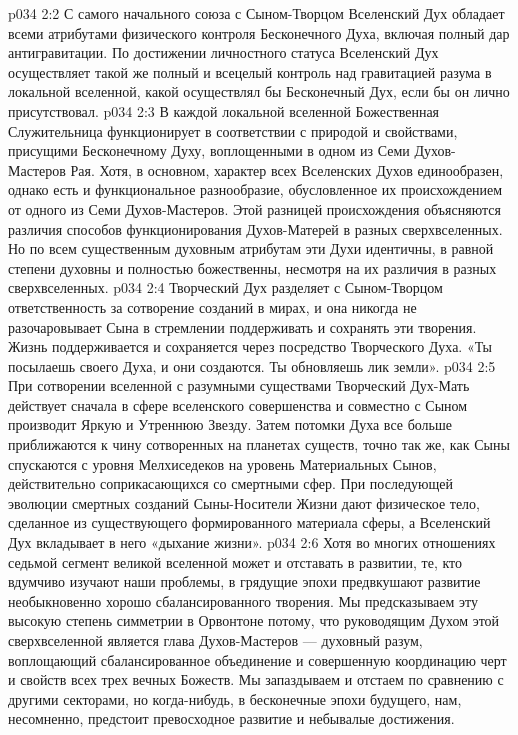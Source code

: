 \vs p034 2:2 С самого начального союза с Сыном\hyp{}Творцом Вселенский Дух обладает всеми атрибутами физического контроля Бесконечного Духа, включая полный дар антигравитации. По достижении личностного статуса Вселенский Дух осуществляет такой же полный и всецелый контроль над гравитацией разума в локальной вселенной, какой осуществлял бы Бесконечный Дух, если бы он лично присутствовал.
\vs p034 2:3 \pc В каждой локальной вселенной Божественная Служительница функционирует в соответствии с природой и свойствами, присущими Бесконечному Духу, воплощенными в одном из Семи Духов\hyp{}Мастеров Рая. Хотя, в основном, характер всех Вселенских Духов единообразен, однако есть и функциональное разнообразие, обусловленное их происхождением от одного из Семи Духов\hyp{}Мастеров. Этой разницей происхождения объясняются различия способов функционирования Духов\hyp{}Матерей в разных сверхвселенных. Но по всем существенным духовным атрибутам эти Духи идентичны, в равной степени духовны и полностью божественны, несмотря на их различия в разных сверхвселенных.
\vs p034 2:4 \pc Творческий Дух разделяет с Сыном\hyp{}Творцом ответственность за сотворение созданий в мирах, и она никогда не разочаровывает Сына в стремлении поддерживать и сохранять эти творения. Жизнь поддерживается и сохраняется через посредство Творческого Духа. «Ты посылаешь своего Духа, и они создаются. Ты обновляешь лик земли».
\vs p034 2:5 При сотворении вселенной с разумными существами Творческий Дух\hyp{}Мать действует сначала в сфере вселенского совершенства и совместно с Сыном производит Яркую и Утреннюю Звезду. Затем потомки Духа все больше приближаются к чину сотворенных на планетах существ, точно так же, как Сыны спускаются с уровня Мелхиседеков на уровень Материальных Сынов, действительно соприкасающихся со смертными сфер. При последующей эволюции смертных созданий Сыны\hyp{}Носители Жизни дают физическое тело, сделанное из существующего формированного материала сферы, а Вселенский Дух вкладывает в него «дыхание жизни».
\vs p034 2:6 \pc Хотя во многих отношениях седьмой сегмент великой вселенной может и отставать в развитии, те, кто вдумчиво изучают наши проблемы, в грядущие эпохи предвкушают развитие необыкновенно хорошо сбалансированного творения. Мы предсказываем эту высокую степень симметрии в Орвонтоне потому, что руководящим Духом этой сверхвселенной является глава Духов\hyp{}Мастеров --- духовный разум, воплощающий сбалансированное объединение и совершенную координацию черт и свойств всех трех вечных Божеств. Мы запаздываем и отстаем по сравнению с другими секторами, но когда\hyp{}нибудь, в бесконечные эпохи будущего, нам, несомненно, предстоит превосходное развитие и небывалые достижения.

